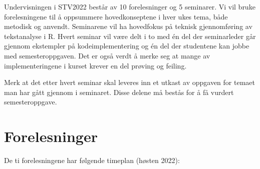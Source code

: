 \documentclass[
]{book}
\begin{document}
Undervisningen i STV2022 består av 10 forelesninger og 5 seminarer. Vi vil bruke forelesningene til å oppsummere hovedkonseptene i hver ukes tema, både metodisk og anvendt. Seminarene vil ha hovedfokus på teknisk gjennomføring av tekstanalyse i R. Hvert seminar vil være delt i to med én del der seminarleder går gjennom ekstempler på kodeimplementering og én del der studentene kan jobbe med semesteroppgaven. Det er også verdt å merke seg at mange av implementeringene i kurset krever en del prøving og feiling.

Merk at det etter hvert seminar skal leveres inn et utkast av oppgaven for temaet man har gått gjennom i seminaret. Disse delene må bestås for å få vurdert semesteroppgave.

\hypertarget{forelesninger}{%
\section{Forelesninger}\label{forelesninger}}

De ti forelesningene har følgende timeplan (høsten 2022):
\end{document}
